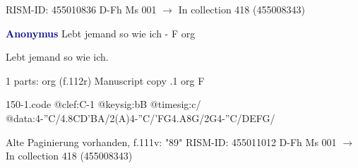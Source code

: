 \documentclass[twocolumn]{book}
\begin{document}
\newline RISM-ID: 455010836
\newline D-Fh  Ms 001
\newline $\rightarrow$ In collection 418 (455008343)
      
\newline \par \vspace{7pt} \textcolor{darkblue}{\textbf{Anonymus  }}
\newline Lebt jemand so wie ich - F
\newline org
\newline \begin{itshape} Lebt jemand so wie ich.\end{itshape} 
\newline \textcolor{darkblue}{}  1 parts: org  (f.112r)
\newline Manuscript copy
.1  org  F  
\begin{filecontents*}{150-1.code}
@clef:C-1
@keysig:bB
@timesig:c/
@data:4-''C/4.8CD'BA/2(A)4-''C/'FG4.A8G/2G4-''C/DEFG/
\end{filecontents*}
\newline
%

\newline Alte Paginierung vorhanden, f.111v: "89"
\newline RISM-ID: 455011012
\newline D-Fh  Ms 001
\newline $\rightarrow$ In collection 418 (455008343)
      
\end{document}
